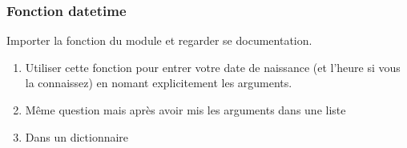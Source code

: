 \documentclass[letterpaper,10pt,english]{sphinxhowto}
\begin{document}
\begin{sphinxVerbatim}[commandchars=\\\{\}]
   

  
     

   
       

   
       
\end{sphinxVerbatim}


\subsubsection{Fonction datetime}
\label{\detokenize{cours1_fonctions_corr_exercices:fonction-datetime}}
\sphinxAtStartPar
Importer la fonction  du module  et regarder se documentation.
\begin{enumerate}
%
\item {} 
\sphinxAtStartPar
Utiliser cette fonction pour entrer votre date de naissance (et l’heure si vous la connaissez) en nomant explicitement les arguments.

\item {} 
\sphinxAtStartPar
Même question mais après avoir mis les arguments dans une liste

\item {} 
\sphinxAtStartPar
Dans un dictionnaire

\end{enumerate}
\end{document}
